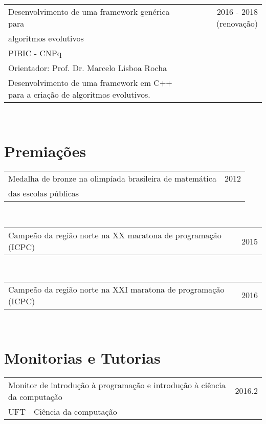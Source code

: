 \documentclass[a4paper,10pt]{article}
\begin{document}
\begin{tabular}{p{11cm}|r}
  Desenvolvimento de uma framework genérica para  & \textsc{2016 - 2018} (renovação)  \\
  algoritmos evolutivos & \\
  PIBIC - CNPq & \\
  Orientador: Prof. Dr. Marcelo Lisboa Rocha & \\ 
  \footnotesize{Desenvolvimento de uma framework em C++ para a criação de algoritmos evolutivos.} & \\
\end{tabular}\\


\section{Premiações}

\begin{tabular}{p{11cm}|r}
  Medalha de bronze na olimpíada brasileira de matemática & \textsc{2012} \\
  das escolas públicas &  \\
\end{tabular}\\

\begin{tabular}{p{11cm}|r}
  Campeão da região norte na XX maratona de programação (ICPC) & \textsc{2015} \\
\end{tabular}\\

\begin{tabular}{p{11cm}|r}
  Campeão da região norte na XXI maratona de programação (ICPC) & \textsc{2016} \\
\end{tabular}\\


\section{Monitorias e Tutorias}

\begin{tabular}{p{11cm}|r}
  Monitor de introdução à programação e introdução à ciência da computação & \textsc{2016.2} \\
  UFT - Ciência da computação & \\
\end{tabular}\\
\end{document}
